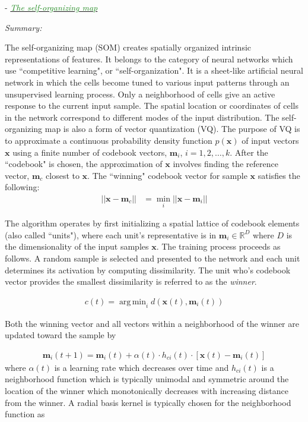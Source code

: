 \documentclass[]{article}
\DeclareMathOperator*{\argmin}{arg\,min}
\newcommand{\paperentry}[4]{
            \hangindent=1cm
            \cite{#1} - \href{run:../References/#3}{\textcolor{ForestGreen}{\textit{#2}}}
            
            \noindent            
            \begin{minipage}[t]{0.1\linewidth}\hfill\end{minipage}
            \begin{minipage}[t]{0.8\linewidth}\textcolor{NavyBlue}{{\textit{Summary:}}}#4\end{minipage}
            \vspace{.25cm}
          }
\begin{document}
	\paperentry{Kohonen1990SOM}
	{The self-organizing map}
	{Manifold_Representation_Learning/CHL/Kohonen1990SOM.pdf}
	{}
	\newline
	The self-organizing map (SOM) creates spatially organized intrinsic representations of features.  It belongs to the category of neural networks which use ``competitive learning", or ``self-organization".  It is a sheet-like artificial neural network in which the cells become tuned to various input patterns through an unsupervised learning process.  Only a neighborhood of cells give an active response to the current input sample.  The spatial location or coordinates of cells in the network correspond to different modes of the input distribution. The self-organizing map is also a form of vector quantization (VQ).  The purpose of VQ is to approximate a continuous probability density function $p(\bm{x})$ of input vectors $\bm{x}$ using a finite number of codebook vectors, $\bm{m}_i$, $i=1,2,\dots,k$.  After the ``codebook" is chosen, the approximation of $\bm{x}$ involves finding the reference vector, $\bm{m}_c$ closest to $\bm{x}$.  The ``winning" codebook vector for sample $\bm{x}$ satisfies the following:
	\begin{align*}
		|| \bm{x} - \bm{m}_c|| &= \min_{i}|| \bm{x} - \bm{m}_{i} ||
	\end{align*}	
	\noindent
	
	The algorithm operates by first initializing a spatial lattice of codebook elements (also called ``units"), where each unit's representative is in $\bm{m}_i \in \mathbb{R}^{D}$ where $D$ is the dimensionality of the input samples $\bm{x}$.  The training process proceeds as follows.  A random sample is selected and presented to the network and each unit determines its activation by computing dissimilarity.	 The unit who's codebook vector provides the smallest dissimilarity is referred to as the \textit{winner}.
	
	\begin{align*}
		c(t) = \argmin_{i} d(\bm{x}(t),\bm{m}_{i}(t))
	\end{align*}
	\noindent
	
	Both the winning vector and all vectors within a neighborhood of the winner are updated toward the sample by 
	
	\begin{align*}
		\bm{m}_{i}(t+1) = \bm{m}_{i}(t) + \alpha(t) \cdot h_{ci}(t) \cdot [ \bm{x}(t) - \bm{m}_{i}(t) ] 
	\end{align*}
	\noindent
	where $\alpha(t)$ is a learning rate which decreases over time and $h_{ci}(t)$ is a neighborhood function which is typically unimodal and symmetric around the location of the winner which monotonically decreases with increasing distance from the winner.  A radial basis kernel is typically chosen for the neighborhood function as 
	
\end{document}

